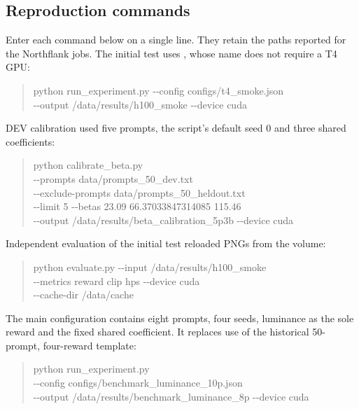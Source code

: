 \documentclass[11pt,a4paper]{article}
\newcommand{\code}[1]{\texttt{\detokenize{#1}}}
\begin{document}
\subsection{Reproduction commands}
Enter each command below on a single line. They retain the paths reported for the Northflank jobs. The initial test uses \code{configs/t4_smoke.json}, whose name does not require a T4 GPU:
\begin{quote}\small\ttfamily
python run\_experiment.py -{}-config configs/t4\_smoke.json\\
\hspace*{1em}-{}-output /data/results/h100\_smoke -{}-device cuda
\end{quote}
DEV calibration used five prompts, the script's default seed 0 and three shared coefficients:
\begin{quote}\small\ttfamily
python calibrate\_beta.py\\
\hspace*{1em}-{}-prompts data/prompts\_50\_dev.txt\\
\hspace*{1em}-{}-exclude-prompts data/prompts\_50\_heldout.txt\\
\hspace*{1em}-{}-limit 5 -{}-betas 23.09 66.37033847314085 115.46\\
\hspace*{1em}-{}-output /data/results/beta\_calibration\_5p3b -{}-device cuda
\end{quote}
Independent evaluation of the initial test reloaded PNGs from the volume:
\begin{quote}\small\ttfamily
python evaluate.py -{}-input /data/results/h100\_smoke\\
\hspace*{1em}-{}-metrics reward clip hps -{}-device cuda\\
\hspace*{1em}-{}-cache-dir /data/cache
\end{quote}
\begin{samepage}
The main configuration contains eight prompts, four seeds, luminance as the sole reward and the fixed shared coefficient. It replaces use of the historical 50-prompt, four-reward template:
\begin{quote}\small\ttfamily
python run\_experiment.py\\
\hspace*{1em}-{}-config configs/benchmark\_luminance\_10p.json\\
\hspace*{1em}-{}-output /data/results/benchmark\_luminance\_8p -{}-device cuda
\end{quote}
\end{samepage}
\end{document}

